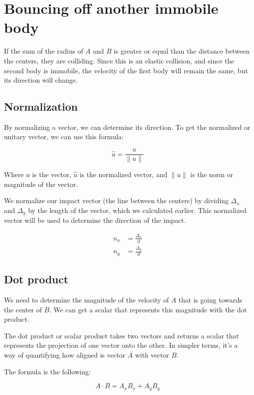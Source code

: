 \documentclass{amsart}
\begin{document}
\section{Bouncing off another immobile body}

If the sum of the radius of $A$ and $B$ is greater or equal than the distance
between the centers, they are colliding. Since this is an elastic collision, and
since the second body is immobile, the velocity of the first body will remain
the same, but its direction will change.

\subsection{Normalization}

By normalizing a vector, we can determine its direction. To get the normalized
or unitary vector, we can use this formula:

\begin{displaymath}
  \hat{u} = \frac{u}{\|u\|}
\end{displaymath}

Where $u$ is the vector, $\hat{u}$ is the normalized vector, and $\|u\|$ is the
norm or magnitude of the vector.

We normalize our impact vector (the line between the centers) by dividing
$\Delta_x$ and $\Delta_y$ by the length of the vector, which we calculated
earlier. This normalized vector will be used to determine the direction of the
impact.

\begin{align*}
  n_x &= \frac{\Delta_x}{d} \\
  n_y &= \frac{\Delta_y}{d}
\end{align*}

\subsection{Dot product}

We need to determine the magnitude of the velocity of $A$ that is going towards
the center of $B$. We can get a scalar that represents this magnitude with the
dot product.

The dot product or scalar product takes two vectors and returns a scalar that
represents the projection of one vector onto the other. In simpler terms, it's a
way of quantifying how aligned is vector $A$ with vector $B$.

The formula is the following:

\begin{displaymath}
  A \cdot B = A_x B_x + A_y B_y
\end{displaymath}
\end{document}
